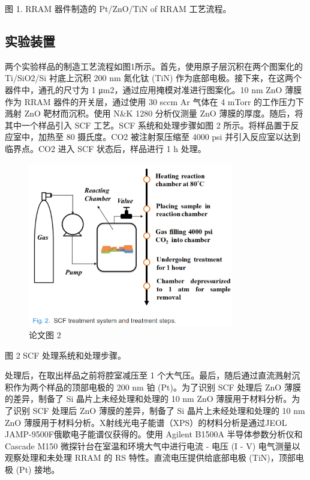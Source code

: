 图 1. RRAM 器件制造的 Pt/ZnO/TiN of RRAM 工艺流程。

\subsection{实验装置}

两个实验样品的制造工艺流程如图1所示。首先，使用原子层沉积在两个图案化的 Ti/SiO2/Si 衬底上沉积 200 nm 氮化钛 (TiN) 作为底部电极。接下来，在这两个器件中，通孔的尺寸为 1 μm2，通过应用掩模对准进行图案化。10 nm ZnO 薄膜作为 RRAM 器件的开关层，通过使用 30 sccm Ar 气体在 4 mTorr 的工作压力下溅射 ZnO 靶材而沉积。使用 N\&K 1280 分析仪测量 ZnO 薄膜的厚度。随后，将其中一个样品引入 SCF 工艺。SCF 系统和处理步骤如图 2 所示。将样品置于反应室中，加热至 80 摄氏度。CO2 被注射泵压缩至 4000 psi 并引入反应室以达到临界点。CO2 进入 SCF 状态后，样品进行 1 h 处理。

\begin{figure}[htb]
\centering 
\includegraphics[width=0.80\textwidth]{img/c1m2.png} 
\caption{论文图 2}
\label{Test}
\end{figure}

图 2 SCF 处理系统和处理步骤。

处理后，在取出样品之前将腔室减压至 1 个大气压。最后，随后通过直流溅射沉积作为两个样品的顶部电极的 200 nm 铂 (Pt)。为了识别 SCF 处理后 ZnO 薄膜的差异，制备了 Si 晶片上未经处理和处理的 10 nm ZnO 薄膜用于材料分析。为了识别 SCF 处理后 ZnO 薄膜的差异，制备了 Si 晶片上未经处理和处理的 10 nm ZnO 薄膜用于材料分析。X射线光电子能谱（XPS）的材料分析是通过JEOL JAMP-9500F俄歇电子能谱仪获得的。使用 Agilent B1500A 半导体参数分析仪和 Cascade M150 微探针台在室温和环境大气中进行电流 - 电压 (I - V) 电气测量以观察处理和未处理 RRAM 的 RS 特性。直流电压提供给底部电极 (TiN)，顶部电极 (Pt) 接地。

